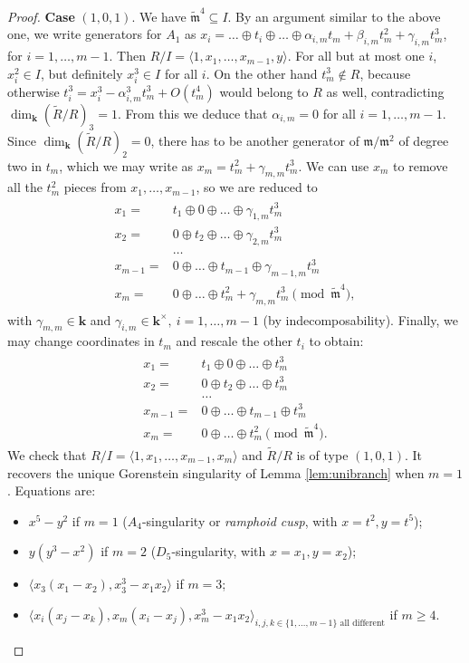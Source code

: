 \documentclass[11pt]{amsart}
\renewcommand{\k}{\mathbf k}
\newcommand{\m}{\mathfrak m}
\newcommand{\tR}{\widetilde{R}}
\newcommand{\tm}{\widetilde{\mathfrak m}}
\theoremstyle{plain}
\theoremstyle{definition}
\begin{document}
\begin{proof}
 \textbf{Case} $(1,0,1)$. We have $\tm^4\subseteq I$. By an argument similar to the above one, we write generators for $A_1$ as $x_i=\ldots\oplus t_i\oplus\ldots \oplus\alpha_{i,m}t_m+\beta_{i,m}t_m^2+\gamma_{i,m}t_m^3$, for $i=1,\ldots,m-1$.
 Then $R/I=\langle 1,x_1,\ldots,x_{m-1},y\rangle$. For all but at most one $i$, $x_i^2\in I$, but definitely $x_i^3\in I$ for all $i$. On the other hand $t_m^3\notin R$, because otherwise $t_i^3=x_i^3-\alpha_{i,m}^3t_m^3+O(t_m^4)$ would belong to $R$ as well, contradicting $\dim_\k(\tR/R)_3=1$. From this we deduce that $\alpha_{i,m}=0$ for all $i=1,\ldots,m-1$. Since $\dim_\k(\tR/R)_2=0$, there has to be another generator of $\m/\m^2$ of degree two in $t_m$, which we may write as $x_m=t_m^2+\gamma_{m,m}t_m^3$. We can use $x_m$ to remove all the $t_m^2$ pieces from $x_1,\ldots,x_{m-1}$, so we are reduced to
  \begin{align}\label{coordIII-cs}
 \begin{split}
  x_1= & t_1\oplus0\oplus\ldots\oplus \gamma_{1,m}t_m^3\\
  x_2= & 0\oplus t_2\oplus\ldots\oplus \gamma_{2,m}t_m^3\\
  &\ldots\\
  x_{m-1}= & 0\oplus\ldots\oplus t_{m-1}\oplus \gamma_{m-1,m}t_m^3\\
  x_m= & 0\oplus\ldots\oplus t_m^2+\gamma_{m,m}t_m^3 \pmod{\tm^4},
  \end{split}
 \end{align}
 with $\gamma_{m,m}\in\k$ and $\gamma_{i,m}\in\k^\times,\ i=1,\ldots,m-1$ (by indecomposability). Finally, we may change coordinates in $t_m$ and rescale the other $t_i$ to obtain:
 \begin{align}\label{coordIII}
 \begin{split}
  x_1= & t_1\oplus0\oplus\ldots\oplus t_m^3\\
  x_2= & 0\oplus t_2\oplus\ldots\oplus t_m^3\\
  &\ldots\\
  x_{m-1}= & 0\oplus\ldots\oplus t_{m-1}\oplus t_m^3\\
  x_m= & 0\oplus\ldots\oplus t_m^2 \pmod{\tm^4}.
  \end{split}
 \end{align}
 We check that $R/I=\langle 1,x_1,\ldots,x_{m-1},x_m\rangle$ and $\tR/R$ is of type $(1,0,1)$. It recovers the unique Gorenstein singularity of Lemma \ref{lem:unibranch} when $m=1$. Equations are:
 \begin{itemize}
  \item $x^5-y^2$ if $m=1$ ($A_4$-singularity or \emph{ramphoid cusp}, with $x=t^2,y=t^5$);
  \item $y(y^3-x^2)$ if $m=2$ ($D_5$-singularity, with $x=x_1,y=x_2$);
  \item $\langle x_3(x_1-x_2),x_3^3-x_1x_2\rangle$ if $m=3$;
  \item $\langle x_i(x_j-x_k), x_m(x_i-x_j),x_m^3-x_1x_2\rangle_{i,j,k\in\{1,\ldots,m-1\}\text{ all different}}$ if $m\geq 4$.
 \end{itemize}
\end{proof}
\end{document}
